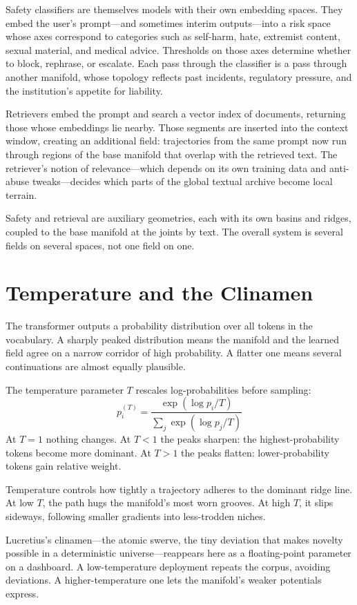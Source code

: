 \documentclass[12pt,a4paper]{article}
\begin{document}
Safety classifiers are themselves models with their own embedding spaces. They embed the user's prompt---and sometimes interim outputs---into a risk space whose axes correspond to categories such as self-harm, hate, extremist content, sexual material, and medical advice. Thresholds on those axes determine whether to block, rephrase, or escalate. Each pass through the classifier is a pass through another manifold, whose topology reflects past incidents, regulatory pressure, and the institution's appetite for liability.

Retrievers embed the prompt and search a vector index of documents, returning those whose embeddings lie nearby. Those segments are inserted into the context window, creating an additional field: trajectories from the same prompt now run through regions of the base manifold that overlap with the retrieved text. The retriever's notion of relevance---which depends on its own training data and anti-abuse tweaks---decides which parts of the global textual archive become local terrain.

Safety and retrieval are auxiliary geometries, each with its own basins and ridges, coupled to the base manifold at the joints by text. The overall system is several fields on several spaces, not one field on one.

\section{Temperature and the Clinamen}

The transformer outputs a probability distribution over all tokens in the vocabulary. A sharply peaked distribution means the manifold and the learned field agree on a narrow corridor of high probability. A flatter one means several continuations are almost equally plausible.

The temperature parameter $T$ rescales log-probabilities before sampling:
\[
p_i^{(T)} = \frac{\exp(\log p_i / T)}{\sum_j \exp(\log p_j / T)}
\]
At $T = 1$ nothing changes. At $T < 1$ the peaks sharpen: the highest-probability tokens become more dominant. At $T > 1$ the peaks flatten: lower-probability tokens gain relative weight.

Temperature controls how tightly a trajectory adheres to the dominant ridge line. At low $T$, the path hugs the manifold's most worn grooves. At high $T$, it slips sideways, following smaller gradients into less-trodden niches.

Lucretius's clinamen---the atomic swerve, the tiny deviation that makes novelty possible in a deterministic universe---reappears here as a floating-point parameter on a dashboard. A low-temperature deployment repeats the corpus, avoiding deviations. A higher-temperature one lets the manifold's weaker potentials express.
\end{document}
